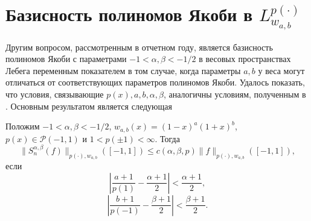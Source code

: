 \section{Базисность полиномов Якоби в \texorpdfstring{$L^{p(\cdot)}_{w_{a,b}}$}{Lp(x)w}}
Другим вопросом, рассмотренным в отчетном году, является базисность полиномов Якоби с параметрами
$-1<\alpha,\beta<-1/2$
в весовых пространствах Лебега переменным показателем в том случае, когда параметры $a,b$ у веса могут отличаться от соответствующих параметров полиномов Якоби. Удалось показать, что условия, связывающие $p(x),a,b,\alpha,\beta$, аналогичны условиям, полученным в \cite{tad-Muckenhoupt}.
Основным результатом является следующая
\begin{theorem}
  Положим $-1<\alpha,\beta<-1/2$, $w_{a,b}(x)=(1-x)^a(1+x)^b$, $p(x)\in\mathcal{P}(-1,1)$ и $1<p(\pm1)<\infty$. Тогда
$$
\|S_n^{\alpha,\beta}(f)\|_{p(\cdot),w_{a,b}}([-1,1])\le c(\alpha,\beta,p)\|f\|_{p(\cdot),w_{a,b}}([-1,1]),
$$
если
$$
\left|\frac{a+1}{p(1)}-\frac{\alpha+1}2\right|<\frac{\alpha+1}2,
$$
$$
\left|\frac{b+1}{p(-1)}-\frac{\beta+1}2\right|<\frac{\beta+1}2.
$$
\end{theorem}



